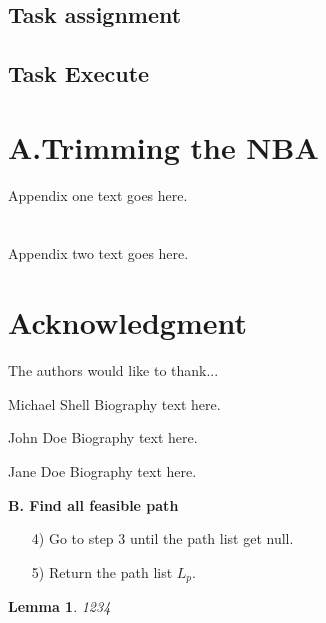 \documentclass[journal]{IEEEtran}
\newtheorem{lemma}{Lemma}
\begin{document}
\subsection{Task assignment}
\subsection{Task Execute}


\appendices
\section{A.Trimming the NBA}
Appendix one text goes here.


\section{}
Appendix two text goes here.


\section*{Acknowledgment}


The authors would like to thank...


\ifCLASSOPTIONcaptionsoff
  \newpage
\fi






\begin{IEEEbiography}{Michael Shell}
Biography text here.
\end{IEEEbiography}

\begin{IEEEbiographynophoto}{John Doe}
Biography text here.
\end{IEEEbiographynophoto}


\begin{IEEEbiographynophoto}{Jane Doe}
Biography text here.
\end{IEEEbiographynophoto}


 \textbf{B. Find all feasible path}

\begin{itemize}
	\item[4)] 
	Go to step 3 until the path list get null.
\end{itemize}
\begin{itemize}
	\item[5)] 
	Return the path list $L_p$.
\end{itemize}
\begin{lemma}
	1234
\end{lemma}



\end{document}
